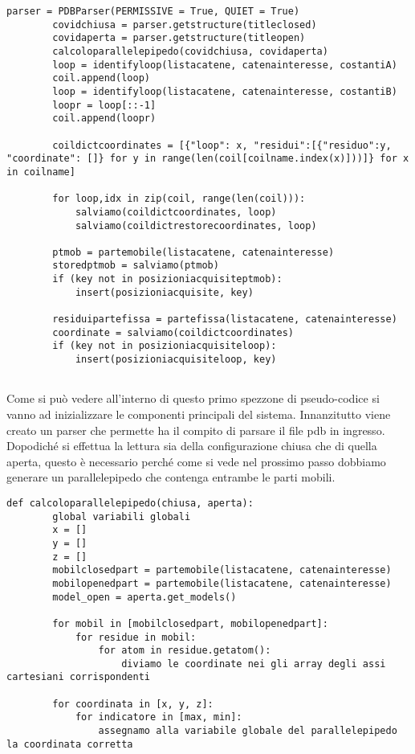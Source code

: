 \begin{minipage}{\textwidth}
	\begin{lstlisting}[caption={Fase d'inizializzazione del framework}]
		parser = PDBParser(PERMISSIVE = True, QUIET = True)
		covidchiusa = parser.getstructure(titleclosed)
		covidaperta = parser.getstructure(titleopen)
		calcoloparallelepipedo(covidchiusa, covidaperta)
		loop = identifyloop(listacatene, catenainteresse, costantiA)
		coil.append(loop)
		loop = identifyloop(listacatene, catenainteresse, costantiB)
		loopr = loop[::-1]
		coil.append(loopr)
		
		coildictcoordinates = [{"loop": x, "residui":[{"residuo":y, "coordinate": []} for y in range(len(coil[coilname.index(x)]))]} for x in coilname]
		
		for loop,idx in zip(coil, range(len(coil))):
			salviamo(coildictcoordinates, loop)
			salviamo(coildictrestorecoordinates, loop)
		
		ptmob = partemobile(listacatene, catenainteresse)
		storedptmob = salviamo(ptmob)
		if (key not in posizioniacquisiteptmob):
			insert(posizioniacquisite, key)
		
		residuipartefissa = partefissa(listacatene, catenainteresse)
		coordinate = salviamo(coildictcoordinates)
		if (key not in posizioniacquisiteloop):
			insert(posizioniacquisiteloop, key)
	
	\end{lstlisting}
\end{minipage}
Come si può vedere all'interno di questo primo spezzone di pseudo-codice si vanno ad inizializzare le componenti principali del sistema. Innanzitutto viene creato un parser che permette ha il compito di parsare il file pdb in ingresso. Dopodiché si effettua la lettura sia della configurazione chiusa che di quella aperta, questo è necessario perché come si vede nel prossimo passo dobbiamo generare un parallelepipedo che contenga entrambe le parti mobili. 

\begin{minipage}{\textwidth}
	\begin{lstlisting}[caption={Calcolo del parallelepipedo}]
		def calcoloparallelepipedo(chiusa, aperta):
		global variabili globali
		x = []
		y = []
		z = []
		mobilclosedpart = partemobile(listacatene, catenainteresse)
		mobilopenedpart = partemobile(listacatene, catenainteresse)
		model_open = aperta.get_models()
		
		for mobil in [mobilclosedpart, mobilopenedpart]:
			for residue in mobil:
				for atom in residue.getatom():
					diviamo le coordinate nei gli array degli assi cartesiani corrispondenti
		
		for coordinata in [x, y, z]:
			for indicatore in [max, min]:
				assegnamo alla variabile globale del parallelepipedo la coordinata corretta

	\end{lstlisting}
\end{minipage}

